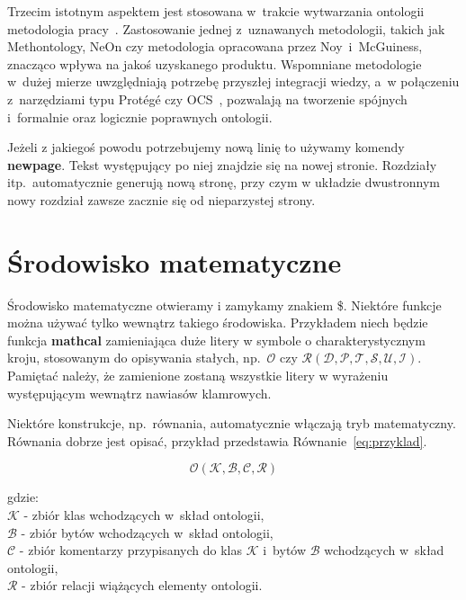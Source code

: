 \documentclass[twoside,a4paper]{book}
\begin{document}
Trzecim istotnym aspektem jest stosowana w~trakcie wytwarzania ontologii metodologia \linebreak[4] pracy~\cite{boinski2012kaskbook,boinski2011security}. Zastosowanie jednej z~uznawanych metodologii, takich jak Methontology, NeOn czy metodologia opracowana przez Noy~i~McGuiness, znacząco wpływa na jakoś uzyskanego produktu. Wspomniane metodologie w~dużej mierze uwzględniają potrzebę przyszłej integracji wiedzy, a~w połączeniu z~narzędziami typu Protégé czy OCS~\cite{boinski2007kaskbook,boinski2009ocs,boinski2010zespolowa}, pozwalają na tworzenie spójnych i~formalnie oraz logicznie poprawnych ontologii.

Jeżeli z jakiegoś powodu potrzebujemy nową linię to używamy komendy \textbf{newpage}. \newpage Tekst występujący po niej znajdzie się na nowej stronie. Rozdziały itp.\ automatycznie generują nową stronę, przy czym w układzie dwustronnym nowy rozdział zawsze zacznie się od nieparzystej strony.

\section{Środowisko matematyczne}

Środowisko matematyczne otwieramy i zamykamy znakiem \$. Niektóre funkcje można używać tylko wewnątrz takiego środowiska. Przykładem niech będzie funkcja \textbf{mathcal} zamieniająca duże litery w symbole o charakterystycznym kroju, stosowanym do opisywania stałych, np.\ $\mathcal{O}$ czy $\mathcal{R(D,P,T,S,U,I)}$. Pamiętać należy, że zamienione zostaną wszystkie litery w wyrażeniu występującym wewnątrz nawiasów klamrowych.

Niektóre konstrukcje, np.\ równania, automatycznie włączają tryb matematyczny. Równania dobrze jest opisać, przykład przedstawia Równanie~\ref{eq:przyklad}.

\begin{equation}
  \mathcal{O(K,B,C,R)}
  \label{eq:przyklad}
\end{equation}

gdzie:\\
$\mathcal{K}$ - zbiór klas wchodzących w~skład ontologii,\\
$\mathcal{B}$ - zbiór bytów wchodzących w~skład ontologii,\\
$\mathcal{C}$ - zbiór komentarzy przypisanych do klas $\mathcal{K}$ i~bytów $\mathcal{B}$ wchodzących w~skład ontologii,\\
$\mathcal{R}$ - zbiór relacji wiążących elementy ontologii.
\end{document}
